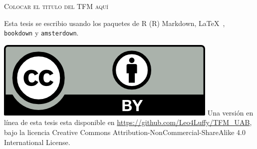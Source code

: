 \documentclass[11pt,spanish,a4paper,oneside,]{book} %
\begin{document}
\frontmatter
\thispagestyle{empty}
\def\drop{.1\textheight}

\vspace*{\drop}
\begin{center}
\Huge \textsc{Colocar el titulo del TFM aquí}
\end{center}

\clearpage
\thispagestyle{empty}
\vspace*{\fill}
\begingroup %
\small
\setlength{\parskip}{\baselineskip} %
\setlength\parindent{0pt} %

Esta tesis se escribio usando los paquetes de R (R) Markdown, \LaTeX\ , \verb+bookdown+  y \verb+amsterdown+.

\vspace{\baselineskip}
\includegraphics{_bookdown_files/CC-BY.png} \newline
Una versión en línea de esta tesis esta disponible en 
\url{https://github.com/Leo4Luffy/TFM_UAB},
bajo la licencia Creative Commons Attribution-NonCommercial-ShareAlike 4.0 International License.
\endgroup
\end{document}
